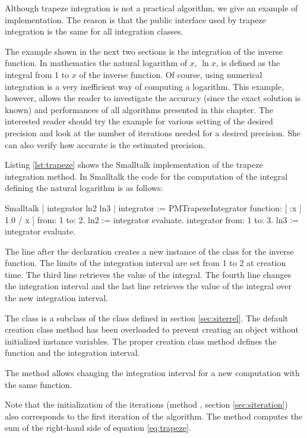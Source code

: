 Although trapeze integration is not a practical algorithm, we give
an example of implementation. The reason is that the public interface used by trapeze integration is the same for all integration classes.

The example shown in the next two sections is the integration of
the inverse function. In mathematics the natural logarithm of $x$,
$\ln x$, is defined as the integral from 1 to $x$ of the inverse
function. Of course, using numerical integration is a very
inefficient way of computing a logarithm. This example, however,
allows the reader to investigate the accuracy (since the exact
solution is known) and performances of all algorithms presented in
this chapter. The interested reader should try the example for
various setting of the desired precision and look at the number of
iterations needed for a desired precision. She can also verify how
accurate is the estimated precision.

Listing \ref{lst:trapeze} shows the Smalltalk implementation of the trapeze integration method. In Smalltalk the code for the computation of the integral defining the natural logarithm is as follows:
\begin{displaycode}{Smalltalk}
| integrator ln2 ln3 |
integrator := PMTrapezeIntegrator
                 function: [ :x | 1.0 / x ] from: 1 to: 2.
ln2 := integrator evaluate.
integrator from: 1 to: 3.
ln3 := integrator evaluate.
\end{displaycode}
The line after the declaration creates a new instance of the class  for the inverse function. The limits of the integration interval are set from 1 to 2 at creation time. The
third line retrieves the value of the integral. The fourth line
changes the integration interval and the last line retrieves the
value of the integral over the new integration interval.

The class  is a subclass of the class
 defined in section
\ref{sec:siterrel}. The default creation class method 
has been overloaded to prevent creating an object without
initialized instance variables. The proper creation class method
defines the function and the integration interval.

The method  allows changing the integration interval
for a new computation with the same function.

Note that the initialization of the iterations (method , \cf section \ref{sec:siteration}) also corresponds to the first iteration of the algorithm.
The method  computes the sum of the right-hand side of equation \ref{eq:trapeze}.

